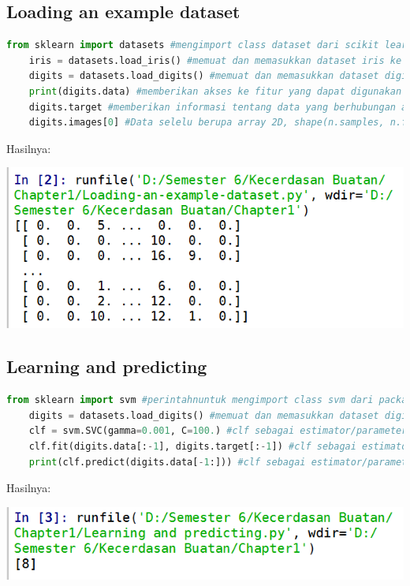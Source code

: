\documentclass{homework}
\begin{document}
\subsection{Loading an example dataset}
\begin{lstlisting}[language=Python]
    from sklearn import datasets #mengimport class dataset dari scikit learn library
    iris = datasets.load_iris() #memuat dan memasukkan dataset iris ke variabel bernama iris
    digits = datasets.load_digits() #memuat dan memasukkan dataset digits ke variabel digits
    print(digits.data) #memberikan akses ke fitur yang dapat digunakan untuk mengklasifikasikan sample digit dan menampilkan di console
    digits.target #memberikan informasi tentang data yang berhubungan atau juga dapat dijadikan sebagai label
    digits.images[0] #Data selelu berupa array 2D, shape(n.samples, n.features), meskipun data aslinya mungkin memiliki bentuk yang berbeda
\end{lstlisting}
Hasilnya:
\begin{center}
    \includegraphics[width=.8\textwidth]{Pict/hasil2.PNG}
\end{center}

\subsection{Learning and predicting}
\begin{lstlisting}[language=Python]
    from sklearn import svm #perintahnuntuk mengimport class svm dari packaged sklearn
    digits = datasets.load_digits() #memuat dan memasukkan dataset digits ke variable digits
    clf = svm.SVC(gamma=0.001, C=100.) #clf sebagai estimator/parameter, svm.SVC sebagai class, gamma sebagai parameter untuk menetapkan nilai secara manual
    clf.fit(digits.data[:-1], digits.target[:-1]) #clf sebagai estimator/parameter, f i t sebagai metode, digits.data sebagai item, [:1] sebagai syntax pythonnya dan menampilkan outputannya
    print(clf.predict(digits.data[-1:])) #clf sebagai estimator/parameter, predict sebagai metode lainnya, digits.data sebagai item dan menampilkan outputannya
\end{lstlisting}
Hasilnya:
\begin{center}
    \includegraphics[width=.8\textwidth]{Pict/hasil3.PNG}
\end{center}
\end{document}

